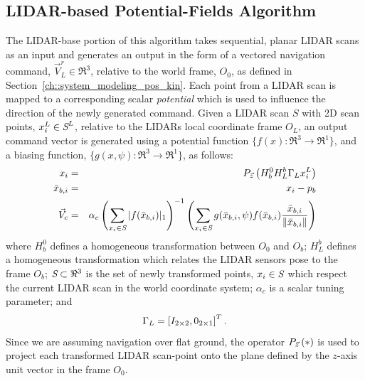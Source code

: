 		\subsection{LIDAR-based Potential-Fields Algorithm}
			The LIDAR-base portion of this algorithm takes sequential, planar LIDAR scans as an input and generates an output in the form of a vectored navigation command, $\vec{V}_{L}^{r}\in \Re^{3}$, relative to the world frame, $O_{0}$, as defined in Section~\ref{ch::system_modeling_pos_kin}. Each point from a LIDAR scan is mapped to a corresponding scalar \emph{potential} which is used to influence the direction of the newly generated command. Given a LIDAR scan $S$ with 2D scan points, $x_{i}^{L}\in\emph{S}^{L}$, relative to the LIDARs local coordinate frame $O_{L}$, an output command vector is generated using a potential function $\{ f(x) : \Re^{3}\rightarrow \Re^{1} \}$, and a biasing function, $\{ g(x,\psi) : \Re^{3}\rightarrow \Re^{1} \}$, as follows:
%
				\begin{eqnarray}
				x_{i}  &=& P_{ \vec{z} } \left( H_{b}^{0} H_{L}^{b} \Gamma_{L} x_{i}^{L} \right) \nonumber\\
				\bar{x}_{b,i} &=&  x_{i}-p_{b} \nonumber \\
				\vec{V}_{c} &=& \alpha_{c} \left(\sum_{x_{i}\in \emph{S}} |f(\bar{x}_{b,i})|_{1}\right)^{-1}  \left( \sum_{x_{i} \in \emph{S}} g( \bar{x}_{b,i},\psi)  f( \bar{x}_{b,i} ) \frac{\bar{x}_{b,i}}{\left\lVert\bar{x}_{b,i}\right\rVert} \right)
				\end{eqnarray}
			where $H_{b}^{0}$ defines a homogeneous transformation between $O_{0}$ and $O_{b}$; $H_{L}^{b}$ defines a homogeneous transformation which relates the LIDAR sensors pose to the frame $O_{b}$; $\emph{S}\subset \Re^{3}$ is the set of newly transformed points, $x_{i} \in \emph{S}$ which respect the current LIDAR scan in the world coordinate system; $\alpha_{c}$ is a scalar tuning parameter; and 
				\begin{equation*}
					\Gamma_{L} = \left[ I_{2\times2}, 0_{2\times1} \right]^{T}.
				\end{equation*}
			Since we are assuming navigation over flat ground, the operator $P_{ \vec{z} }\left(*\right)$ is used to project each transformed LIDAR scan-point onto the plane defined by the $z$-axis unit vector in the frame $O_{0}$.

